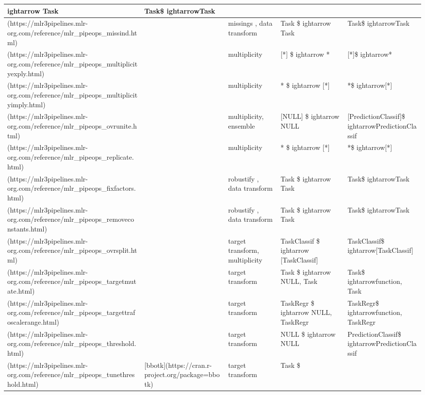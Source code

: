 \documentclass[
]{scrbook}
\begin{document}
\begin{tabular}{l|l|l|l|l}
ightarrow Task & Task\$
ightarrowTask\\
\hline
[`missind`](https://mlr3pipelines.mlr-org.com/reference/mlr\_pipeops\_missind.html) &  & missings      , data transform & Task \$
ightarrow Task & Task\$
ightarrowTask\\
\hline
[`multiplicityexply`](https://mlr3pipelines.mlr-org.com/reference/mlr\_pipeops\_multiplicityexply.html) &  & multiplicity & [*] \$
ightarrow * & [*]\$
ightarrow*\\
\hline
[`multiplicityimply`](https://mlr3pipelines.mlr-org.com/reference/mlr\_pipeops\_multiplicityimply.html) &  & multiplicity & * \$
ightarrow [*] & *\$
ightarrow[*]\\
\hline
[`ovrunite`](https://mlr3pipelines.mlr-org.com/reference/mlr\_pipeops\_ovrunite.html) &  & multiplicity, ensemble & [NULL] \$
ightarrow NULL & [PredictionClassif]\$
ightarrowPredictionClassif\\
\hline
[`replicate`](https://mlr3pipelines.mlr-org.com/reference/mlr\_pipeops\_replicate.html) &  & multiplicity & * \$
ightarrow [*] & *\$
ightarrow[*]\\
\hline
[`fixfactors`](https://mlr3pipelines.mlr-org.com/reference/mlr\_pipeops\_fixfactors.html) &  & robustify     , data transform & Task \$
ightarrow Task & Task\$
ightarrowTask\\
\hline
[`removeconstants`](https://mlr3pipelines.mlr-org.com/reference/mlr\_pipeops\_removeconstants.html) &  & robustify     , data transform & Task \$
ightarrow Task & Task\$
ightarrowTask\\
\hline
[`ovrsplit`](https://mlr3pipelines.mlr-org.com/reference/mlr\_pipeops\_ovrsplit.html) &  & target transform, multiplicity & TaskClassif \$
ightarrow [TaskClassif] & TaskClassif\$
ightarrow[TaskClassif]\\
\hline
[`targetmutate`](https://mlr3pipelines.mlr-org.com/reference/mlr\_pipeops\_targetmutate.html) &  & target transform & Task \$
ightarrow NULL, Task & Task\$
ightarrowfunction, Task\\
\hline
[`targettrafoscalerange`](https://mlr3pipelines.mlr-org.com/reference/mlr\_pipeops\_targettrafoscalerange.html) &  & target transform & TaskRegr \$
ightarrow NULL, TaskRegr & TaskRegr\$
ightarrowfunction, TaskRegr\\
\hline
[`threshold`](https://mlr3pipelines.mlr-org.com/reference/mlr\_pipeops\_threshold.html) &  & target transform & NULL \$
ightarrow NULL & PredictionClassif\$
ightarrowPredictionClassif\\
\hline
[`tunethreshold`](https://mlr3pipelines.mlr-org.com/reference/mlr\_pipeops\_tunethreshold.html) & [bbotk](https://cran.r-project.org/package=bbotk) & target transform & Task \$

\end{tabular}
\end{document}
